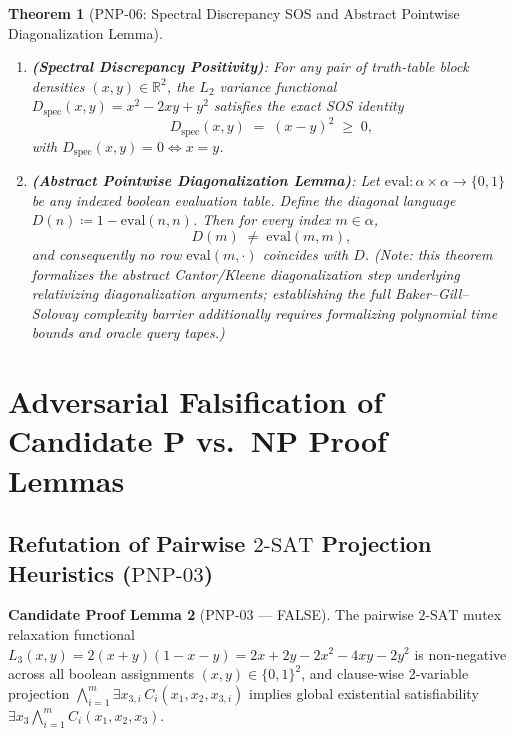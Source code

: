 \documentclass[11pt,a4paper]{article}
\theoremstyle{plain}
\newtheorem{theorem}{Theorem}[section]
\theoremstyle{definition}
\newtheorem{candidate}[theorem]{Candidate Proof Lemma}
\theoremstyle{remark}
\newcommand{\R}{\mathbb{R}}
\newcommand{\ClassP}{\mathbf{P}}
\newcommand{\ClassNP}{\mathbf{NP}}
\begin{document}
\begin{theorem}[$\mathrm{PNP\text{-}06}$: Spectral Discrepancy SOS and Abstract Pointwise Diagonalization Lemma]\label{thm:pnp06}
\begin{enumerate}
  \item \textbf{(Spectral Discrepancy Positivity)}: For any pair of truth-table block densities $(x, y) \in \R^2$, the $L_2$ variance functional $D_{\mathrm{spec}}(x, y) = x^2 - 2xy + y^2$ satisfies the exact SOS identity
  \begin{equation}
    D_{\mathrm{spec}}(x, y) \;=\; (x - y)^2 \;\ge\; 0,
  \end{equation}
  with $D_{\mathrm{spec}}(x, y) = 0 \iff x = y$.
  \item \textbf{(Abstract Pointwise Diagonalization Lemma)}: Let $\mathrm{eval} : \alpha \times \alpha \to \{0, 1\}$ be any indexed boolean evaluation table. Define the diagonal language $D(n) \coloneqq 1 - \mathrm{eval}(n, n)$. Then for every index $m \in \alpha$,
  \begin{equation}
    D(m) \;\ne\; \mathrm{eval}(m, m),
  \end{equation}
  and consequently no row $\mathrm{eval}(m, \cdot)$ coincides with $D$. (Note: this theorem formalizes the abstract Cantor/Kleene diagonalization step underlying relativizing diagonalization arguments; establishing the full Baker--Gill--Solovay complexity barrier additionally requires formalizing polynomial time bounds and oracle query tapes.)
\end{enumerate}
\end{theorem}

\section{Adversarial Falsification of Candidate \texorpdfstring{$\ClassP$ vs.\ $\ClassNP$}{P vs. NP} Proof Lemmas}

\subsection{Refutation of Pairwise \texorpdfstring{$2\text{-SAT}$}{2-SAT} Projection Heuristics (\texorpdfstring{$\mathrm{PNP\text{-}03}$}{PNP-03})}

\begin{candidate}[$\mathrm{PNP\text{-}03}$ --- FALSE]\label{cand:pnp03}
The pairwise $2\text{-SAT}$ mutex relaxation functional $L_3(x, y) = 2(x + y)(1 - x - y) = 2x + 2y - 2x^2 - 4xy - 2y^2$ is non-negative across all boolean assignments $(x, y) \in \{0, 1\}^2$, and clause-wise 2-variable projection $\bigwedge_{i=1}^{m} \exists x_{3,i}\, C_i(x_1, x_2, x_{3,i})$ implies global existential satisfiability $\exists x_3 \bigwedge_{i=1}^{m} C_i(x_1, x_2, x_3)$.
\end{candidate}
\end{document}
